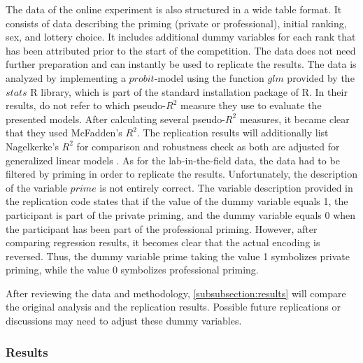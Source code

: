 \documentclass[12pt]{article}
\begin{document}
 The data of the online experiment is also structured in a wide table format. It consists of data describing the priming (private or professional), initial ranking, sex, and lottery choice. It includes additional dummy variables for each rank that has been attributed prior to the start of the competition. The data does not need further preparation and can instantly be used to replicate the results. The data is analyzed by implementing a $probit$-model using the function $glm$ provided by the $stats$ R library, which is part of the standard installation package of R. In their results, \textcite{Kirchler2018} do not refer to which pseudo-$R^{2}$ measure they use to evaluate the presented models. After calculating several pseudo-$R^{2}$ measures, it became clear that they used McFadden's $R^{2}$. The replication results will additionally list Nagelkerke's $R^{2}$ for comparison and robustness check as both are adjusted for generalized linear models \parencite[p.~503]{Cohen2003}. As for the lab-in-the-field data, the data had to be filtered by priming in order to replicate the results. Unfortunately, the description of the variable $prime$ is not entirely correct. The variable description provided in the replication code states that if the value of the dummy variable equals 1, the participant is part of the private priming, and the dummy variable equals 0 when the participant has been part of the professional priming. However, after comparing regression results, it becomes clear that the actual encoding is reversed. Thus, the dummy variable prime taking the value 1 symbolizes private priming, while the value 0  symbolizes professional priming.\par
 After reviewing the data and methodology, \autoref{subsubsection:results} will compare the original analysis and the replication results. Possible future replications or discussions may need to adjust these dummy variables.
 
\subsubsection{Results} \label{subsubsection:results}
\end{document}

